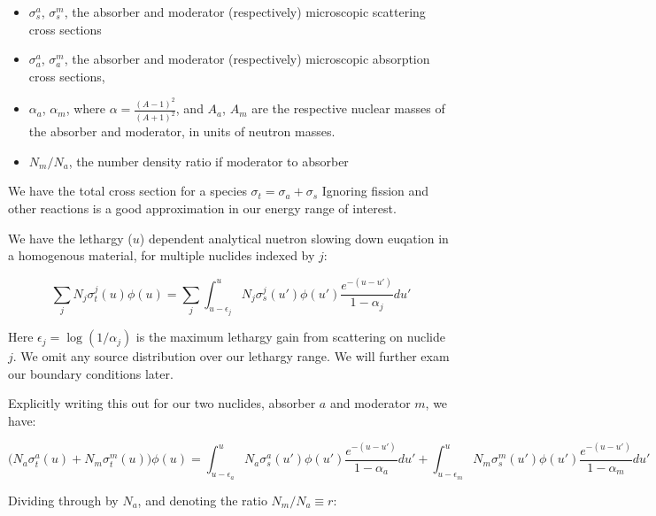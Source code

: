 \documentclass{article}
\begin{document}
\begin{itemize}
    \item $\sigma_s^a$, $\sigma_s^m$, the absorber and moderator (respectively) microscopic scattering cross sections
    \item  $\sigma_a^a$, $\sigma_a^m$, the absorber and moderator (respectively) microscopic absorption cross sections, 
    \item $\alpha_a$, $\alpha_m$, where $\alpha = \frac{(A-1)^2}{(A+1)^2}$, and $A_a$, $A_m$ are the respective nuclear 
        masses of the absorber and moderator, in units of neutron masses.
    \item $N_m/N_a$, the number density ratio if moderator to absorber
\end{itemize}

        We have the total cross section for a species 
        $\sigma_t  =\sigma_a + \sigma_s$
        Ignoring fission and  other reactions is a good approximation in our energy range of interest.

        We have the lethargy ($u$) dependent 
        analytical nuetron slowing down euqation in a homogenous material, for multiple nuclides indexed by $j$:

        \begin{equation}
            \label{eq:slow}
            \sum_j N_j \sigma_t^j(u) \phi(u) = 
            \sum_j \int_{u - \epsilon_j}^{u} N_j \sigma_s^j(u')\phi(u') \frac{e^{-(u-u')}}{1 - \alpha_j}du'
        \end{equation}

        Here $\epsilon_j = \log{(1/\alpha_j)}$ is the maximum lethargy gain from scattering on nuclide $j$. 
        We omit any source distribution over our lethargy range. 
        We will further exam our boundary conditions later.
        
        Explicitly writing this out for our two nuclides, absorber $a$ and moderator $m$, we have:

        \begin{equation}
            \big(N_a \sigma_t^a(u) + N_m \sigma_t^m(u) \big)  \phi(u) = 
            \int_{u - \epsilon_a}^{u} N_a \sigma_s^a(u')\phi(u') \frac{e^{-(u-u')}}{1 - \alpha_a}du'  + 
            \int_{u - \epsilon_m}^{u} N_m \sigma_s^m(u')\phi(u') \frac{e^{-(u-u')}}{1 - \alpha_m}du'  
        \end{equation}
        
        Dividing through by $N_a$, and denoting the ratio $N_m/N_a \equiv r$:
        
\end{document}
